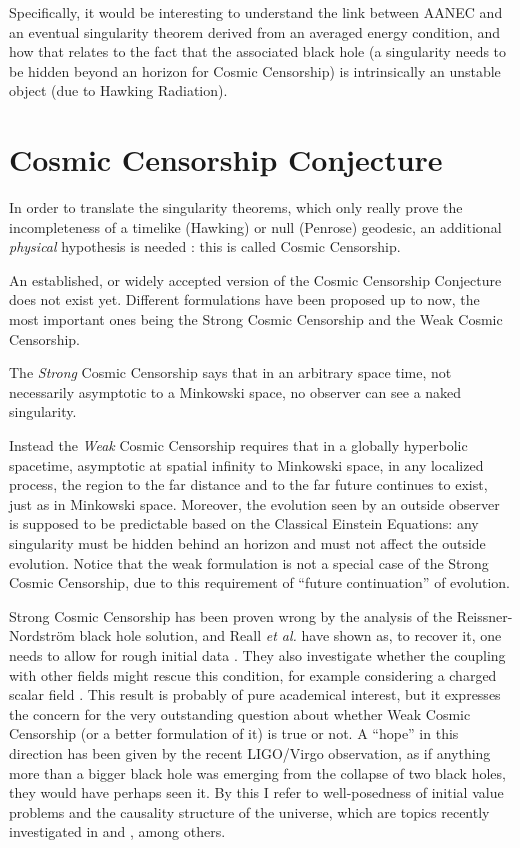 \documentclass[12pt, a4paper]{article}
\begin{document}
Specifically, it would be interesting to understand the link between AANEC and an eventual singularity theorem derived from an averaged energy condition, and how that relates to the fact that the associated black hole (a singularity needs to be hidden beyond an horizon for Cosmic Censorship) is intrinsically an unstable object (due to Hawking Radiation).

\section{Cosmic Censorship Conjecture}

In order to translate the singularity theorems, which only really prove the incompleteness of a timelike (Hawking) or null (Penrose) geodesic, an additional \emph{physical} hypothesis is needed \cite{witten2020light}: this is called Cosmic Censorship.

An established, or widely accepted version of the Cosmic Censorship Conjecture does not exist yet. Different formulations have been proposed up to now, the most important ones being the Strong Cosmic Censorship and the Weak Cosmic Censorship.

The \emph{Strong} Cosmic Censorship says that in an arbitrary space time, not necessarily asymptotic to a Minkowski space, no observer can see a naked singularity.

Instead the \emph{Weak} Cosmic Censorship requires that in a globally hyperbolic spacetime, asymptotic at spatial infinity to Minkowski space, in any localized process, the region to the far distance and to the far future continues to exist, just as in Minkowski space. Moreover, the evolution seen by an outside observer is supposed to be predictable based on the Classical Einstein Equations: any singularity must be hidden behind an horizon and must not affect the outside evolution.
Notice that the weak formulation is not a special case of the Strong Cosmic Censorship, due to this requirement of ``future continuation'' of evolution.

Strong Cosmic Censorship has been proven wrong by the analysis of the Reissner-Nordstr\"om black hole solution, and Reall \emph{et al.} have shown as, to recover it, one needs to allow for rough initial data \cite{dias2018strong}. They also investigate whether the coupling with other fields might rescue this condition, for example considering a charged scalar field \cite{Dias:2018ufh}.
This result is probably of pure academical interest, but it expresses the concern for the very outstanding question about whether Weak Cosmic Censorship (or a better formulation of it) is true or not. 
A ``hope'' in this direction has been given by the recent LIGO/Virgo observation, as if anything more than a bigger black hole was emerging from the collapse of two black holes, they would have perhaps seen it. By this I refer to well-posedness of initial value problems and the causality structure of the universe, which are topics recently investigated in \cite{Kovacs:2020pns} and \cite{Reall:2021voz}, among others.
\end{document}
